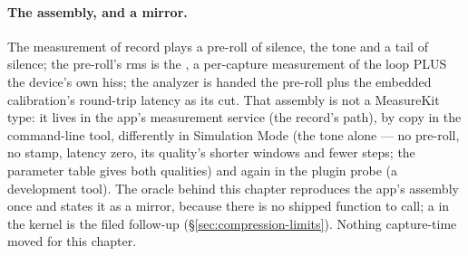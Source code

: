 \documentclass[11pt,a4paper]{article}
\begin{document}
\paragraph{The assembly, and a mirror.} The measurement of record plays a
pre-roll of silence, the tone and a tail of silence; the pre-roll's rms
is the , a per-capture measurement of the loop PLUS the
device's own hiss; the analyzer is handed the pre-roll plus the embedded
calibration's round-trip latency as its cut. That assembly is not a
MeasureKit type: it lives in the app's measurement service (the record's
path), by copy in the command-line tool, differently in Simulation Mode
(the tone alone --- no pre-roll, no stamp, latency zero, its quality's
shorter windows and fewer steps; the parameter table gives both
qualities) and again in the plugin probe (a development tool). The
oracle behind this chapter reproduces the app's assembly once and states
it as a mirror, because there is no shipped function to call; a
 in the kernel is the filed follow-up
(\S\ref{sec:compression-limits}). Nothing capture-time moved for this
chapter.
\end{document}

